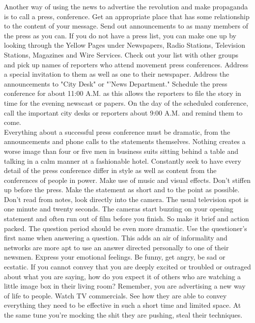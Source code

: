 \documentclass[11pt,twoside,a4paper]{book}
\begin{document}
Another way of using the news to advertise the revolution and make propaganda is to call a press, conference. Get an appropriate place that has some relationship to the content of your message. Send out announcements to as many members of the press as you can. If you do not have a press list, you can make one up by looking through the Yellow Pages under Newspapers, Radio Stations, Television Stations, Magazines and Wire Services. Check out your list with other groups and pick up names of reporters who attend movement press conferences. Address a special invitation to them as well as one to their newspaper. Address the announcements to "City Desk" or "'News Department." Schedule the press conference for about 11:00 A.M. as this allows the reporters to file the story in time for the evening newscast or papers. On the day of the scheduled conference, call the important city desks or reporters about 9:00 A.M. and remind them to come.~\\

Everything about a successful press conference must be dramatic, from the announcements and phone calls to the statements themselves. Nothing creates a worse image than four or five men in business suits sitting behind a table and talking in a calm manner at a fashionable hotel. Constantly seek to have every detail of the press conference differ in style as well as content from the conferences of people in power. Make use of music and visual effects. Don't stiffen up before the press. Make the statement as short and to the point as possible. Don't read from notes, look directly into the camera. The usual television spot is one minute and twenty seconds. The cameras start buzzing on your opening statement and often run out of film before you finish. So make it brief and action packed. The question period should be even more dramatic. Use the questioner's first name when answering a question. This adds an air of informality and networks are more apt to use an answer directed personally to one of their newsmen. Express your emotional feelings. Be funny, get angry, be sad or ecstatic. If you cannot convey that you are deeply excited or troubled or outraged about what you are saying, how do you expect it of others who are watching a little image box in their living room? Remember, you are advertising a new way of life to people. Watch TV commercials. See how they are able to convey everything they need to be effective in such a short time and limited space. At the same tune you're mocking the shit they are pushing, steal their techniques.~\\
\end{document}
